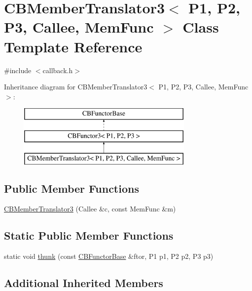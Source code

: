 \hypertarget{class_c_b_member_translator3}{\section{C\+B\+Member\+Translator3$<$ P1, P2, P3, Callee, Mem\+Func $>$ Class Template Reference}
\label{class_c_b_member_translator3}
}


{\ttfamily \#include $<$callback.\+h$>$}

Inheritance diagram for C\+B\+Member\+Translator3$<$ P1, P2, P3, Callee, Mem\+Func $>$\+:\begin{figure}[H]
\begin{center}
\leavevmode
\includegraphics[height=3.000000cm]{class_c_b_member_translator3}
\end{center}
\end{figure}
\subsection*{Public Member Functions}
\begin{DoxyCompactItemize}
\item 
\hyperlink{class_c_b_member_translator3_afbcd4fd12a4415a11738ff18aa4a1325}{C\+B\+Member\+Translator3} (Callee \&c, const Mem\+Func \&m)
\end{DoxyCompactItemize}
\subsection*{Static Public Member Functions}
\begin{DoxyCompactItemize}
\item 
static void \hyperlink{class_c_b_member_translator3_a05fe75348c3aaa930f6cc4f690c638f8}{thunk} (const \hyperlink{class_c_b_functor_base}{C\+B\+Functor\+Base} \&ftor, P1 p1, P2 p2, P3 p3)
\end{DoxyCompactItemize}
\subsection*{Additional Inherited Members}


